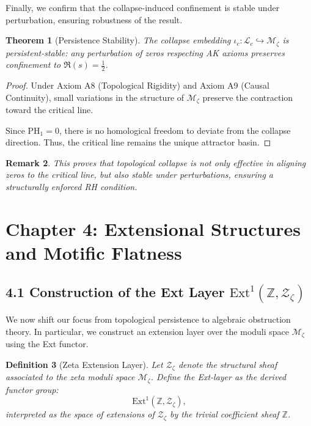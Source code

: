\documentclass[11pt]{article}
\newtheorem{theorem}{Theorem}[section]
\newtheorem{definition}[theorem]{Definition}
\newtheorem{remark}[theorem]{Remark}
\begin{document}
Finally, we confirm that the collapse-induced confinement is stable under perturbation, ensuring robustness of the result.

\begin{theorem}[Persistence Stability]
The collapse embedding $\iota_c: \mathcal{L}_c \hookrightarrow \mathcal{M}_\zeta$ is persistent-stable:  
any perturbation of zeros respecting AK axioms preserves confinement to $\Re(s) = \tfrac{1}{2}$.
\end{theorem}

\begin{proof}
Under Axiom A8 (Topological Rigidity) and Axiom A9 (Causal Continuity),  
small variations in the structure of $\mathcal{M}_\zeta$ preserve the contraction toward the critical line.

Since $\mathrm{PH}_1 = 0$, there is no homological freedom to deviate from the collapse direction.  
Thus, the critical line remains the unique attractor basin.
\end{proof}

\begin{remark}
This proves that topological collapse is not only effective in aligning zeros to the critical line,  
but also stable under perturbations, ensuring a structurally enforced RH condition.
\end{remark}



\section{Chapter 4: Extensional Structures and Motific Flatness}

\subsection{4.1 Construction of the Ext Layer \texorpdfstring{$\mathrm{Ext}^1(\mathbb{Z}, \mathcal{Z}_\zeta)$}{Ext¹(Z, Zeta)}}


We now shift our focus from topological persistence to algebraic obstruction theory.  
In particular, we construct an extension layer over the moduli space $\mathcal{M}_\zeta$ using the Ext functor.

\begin{definition}[Zeta Extension Layer]
Let $\mathcal{Z}_\zeta$ denote the structural sheaf associated to the zeta moduli space $\mathcal{M}_\zeta$.  
Define the Ext-layer as the derived functor group:
\[
\mathrm{Ext}^1(\mathbb{Z}, \mathcal{Z}_\zeta),
\]
interpreted as the space of extensions of $\mathcal{Z}_\zeta$ by the trivial coefficient sheaf $\mathbb{Z}$.
\end{definition}
\end{document}
